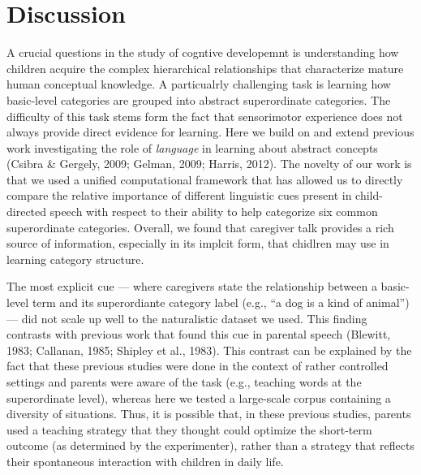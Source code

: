 \documentclass[english,,man,floatsintext]{apa6}
\begin{document}
\hypertarget{discussion}{%
\section{Discussion}\label{discussion}}

A crucial questions in the study of cogntive developemnt is understanding how children acquire the complex hierarchical relationships that characterize mature human conceptual knowledge. A particualrly challenging task is learning how basic-level categories are grouped into abstract superordinate categories. The difficulty of this task stems form the fact that sensorimotor experience does not always provide direct evidence for learning. Here we build on and extend previous work investigating the role of \emph{language} in learning about abstract concepts (Csibra \& Gergely, 2009; Gelman, 2009; Harris, 2012). The novelty of our work is that we used a unified computational framework that has allowed us to directly compare the relative importance of different linguistic cues present in child-directed speech with respect to their ability to help categorize six common superordinate categories. Overall, we found that caregiver talk provides a rich source of information, especially in its implcit form, that chidlren may use in learning category structure.

The most explicit cue --- where caregivers state the relationship between a basic-level term and its superordiante category label (e.g., \enquote{a dog is a kind of animal}) --- did not scale up well to the naturalistic dataset we used. This finding contrasts with previous work that found this cue in parental speech (Blewitt, 1983; Callanan, 1985; Shipley et al., 1983). This contrast can be explained by the fact that these previous studies were done in the context of rather controlled settings and parents were aware of the task (e.g., teaching words at the superordinate level), whereas here we tested a large-scale corpus containing a diversity of situations. Thus, it is possible that, in these previous studies, parents used a teaching strategy that they thought could optimize the short-term outcome (as determined by the experimenter), rather than a strategy that reflects their spontaneous interaction with children in daily life.
\end{document}
